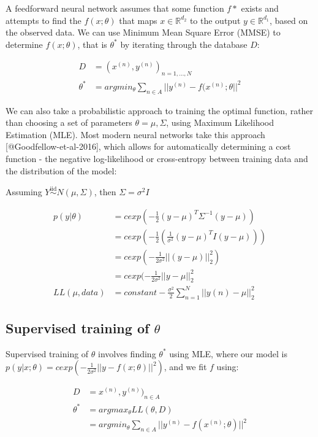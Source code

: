 \documentclass{article}
\begin{document}
A feedforward neural network assumes that some function $f*$ exists and attempts to find the $f(x; \theta)$ that maps 
$x \in \mathbb {R}^{d_2}$ to the output 
$y \in \mathbb {R}^{d_1}$, based on the observed data. We can use Minimum Mean Square Error (MMSE) to determine 
$f(x; \theta)$, that is 
$\theta ^*$ by iterating through the database $D$:  

$$
\begin {aligned}
D & = {(x^{(n)}, y^{(n)})}_{n=1,\ldots, N}\\
\theta^* & = argmin_{\theta} \sum_{n \in A} ||y^{(n)} - f(x^{(n)};\theta ||^2
\end {aligned}
$$

We can also take a probabilistic approach to training the optimal function, rather than choosing a set of parameters $\theta = {\mu, \Sigma}$, using Maximum Likelihood Estimation (MLE).  Most modern neural networks take this approach [@Goodfellow-et-al-2016], which allows for automatically determining a cost function - the negative log-likelihood or cross-entropy between training data and the distribution of the model:  

Assuming $Y \overset{\mathrm{iid}}{\sim} N(\mu, \Sigma)$, then $\Sigma = \sigma^2I$


$$
\begin {aligned}
p(y| \theta) 
  & = c exp(-\frac{1}{2}(y-\mu)^T\Sigma^{-1}(y-\mu))\\
  & = c exp(-\frac{1}{2} (\frac{1}{\sigma^2}(y-\mu)^TI(y-\mu)))\\
  & = c exp(-\frac{1}{2 \sigma^2}||(y-\mu)||_2^2)\\
  & = c exp(-\frac{1}{2 \sigma^2}||y-\mu||_2^2\\
LL(\mu, data) 
  & = constant -\frac{\sigma^2}{2} \sum_{n=1}^N ||y(n)-\mu||_2^2
\end {aligned}
$$
%
\subsection{Supervised training of $\theta$}
\label{sec:supervised}

Supervised training of $\theta$ involves finding $\theta^*$ using MLE, where our model is $p(y|x;\theta)=cexp(-\frac{1}{2\sigma^2}||y-f(x;\theta)||^2)$, and we fit $f$ using:  

$$
\begin {aligned}
D 
  & = {x^{(n)}, y^{(n)})}_{n \in A}\\
\theta^* 
  & = argmax_{\theta}LL(\theta, D)\\
  & = argmin_{\theta} \sum_{n \in A} ||y^{(n)} - f(x^{(n)}; \theta) ||^2
\end {aligned}
$$
\end{document}
